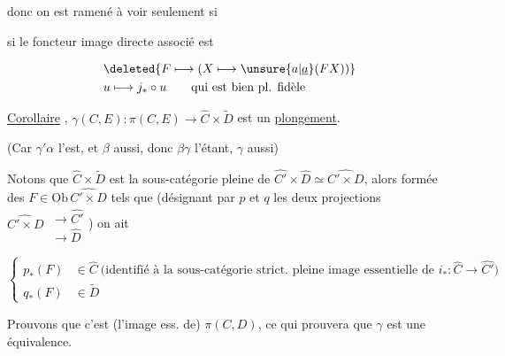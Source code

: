 donc on est ramené à voir seulement si


si le foncteur image  directe associé est

\[
\begin{aligned}
&\deleted{F\longmapsto (X\longmapsto \unsure{a|\underline a}(FX))}\\
&u\longmapsto j_*\circ u\qquad\text{qui est bien pl. fidèle}
\end{aligned}
\]

\uline{Corollaire} , $\gamma(C,E):\pi(C,E)\longrightarrow\widehat C\times\widetilde D$ est un \uline{plongement}.

(Car $\gamma'\alpha$ l'est, et $\beta$ aussi, donc $\beta\gamma$ l'étant, $\gamma$ aussi)

Notons que  $\widehat C\times\widetilde D$ est la sous-catégorie  pleine de $\widehat {C'}\times\widehat D\simeq\widehat{C'\times D}$,  alors formée des $F\in\mathrm{Ob}\,\widehat{C'\times D}$ tels que (désignant par $p$ et $q$ les deux projections $\widehat{C'\times D}\ \substack{\to\widehat{C'}\\[-2pt]\to\widehat D}$) on ait

\[
\left\{\begin{aligned}
p_*(F)&\in\widehat C\ \text{(identifié à la sous-catégorie strict. pleine image essentielle de $i_*:\widehat C\to\widehat{C'}$)}\\
q_*(F)&\in\widetilde D
\end{aligned}\right.
\]

Prouvons que c'est  (l'image ess. de) $\pi(C,D)$, ce qui prouvera que $\gamma$ est une équivalence.

